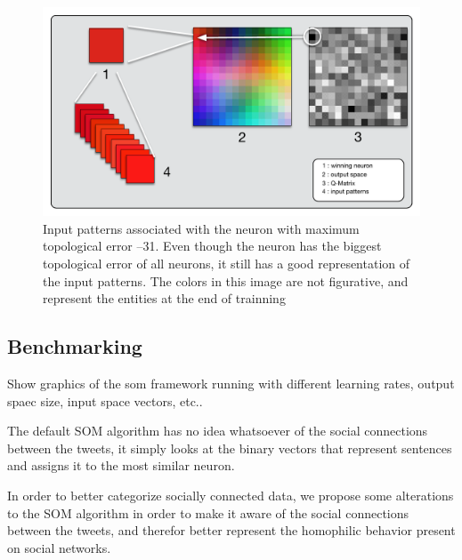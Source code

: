 \begin{figure}[htpb]
  \centering
  \includegraphics[width=0.8\linewidth]{./images/som_trainned.pdf}
  \caption{Input patterns associated with the neuron with maximum topological error --31. Even though the neuron has the biggest topological error of all neurons, it still has a good representation of the input patterns. The colors in this image are not figurative, and represent the entities at the end of trainning  }
  \label{fig:./images/som_trainned}
\end{figure}

\subsection{Benchmarking}
\label{sub:benchmarking}
{\color{red} Show graphics of the som framework running with different learning rates, output spaec size, input space vectors, etc.. }



The default \ac{SOM} algorithm has no idea whatsoever of the social connections between the tweets, it simply looks at the binary vectors that represent sentences and assigns it to the most similar neuron.

In order to better categorize socially connected data, we propose some alterations to the \ac{SOM} algorithm in order to make it aware of the social connections between the tweets, and therefor better represent the homophilic behavior present on social networks.

